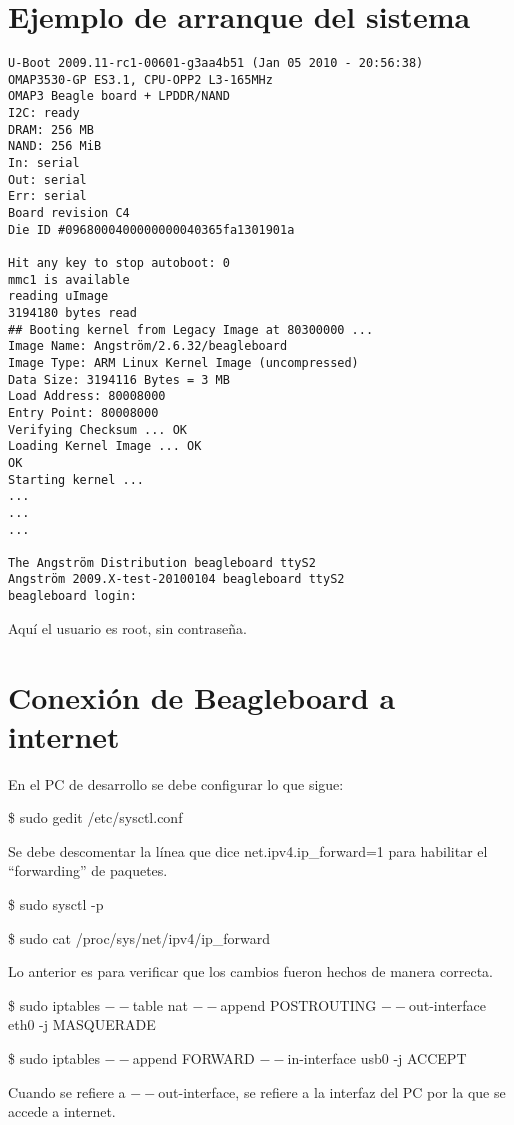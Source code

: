 \newpage
\section{Ejemplo de arranque del sistema}\label{arr}

\begin{verbatim}
U-Boot 2009.11-rc1-00601-g3aa4b51 (Jan 05 2010 - 20:56:38) 
OMAP3530-GP ES3.1, CPU-OPP2 L3-165MHz 
OMAP3 Beagle board + LPDDR/NAND 
I2C: ready 
DRAM: 256 MB 
NAND: 256 MiB 
In: serial 
Out: serial 
Err: serial 
Board revision C4 
Die ID #0968000400000000040365fa1301901a 

Hit any key to stop autoboot: 0 
mmc1 is available 
reading uImage 
3194180 bytes read 
## Booting kernel from Legacy Image at 80300000 ... 
Image Name: Angström/2.6.32/beagleboard 
Image Type: ARM Linux Kernel Image (uncompressed) 
Data Size: 3194116 Bytes = 3 MB 
Load Address: 80008000 
Entry Point: 80008000 
Verifying Checksum ... OK 
Loading Kernel Image ... OK 
OK 
Starting kernel ... 
... 
... 
... 

The Angström Distribution beagleboard ttyS2 
Angström 2009.X-test-20100104 beagleboard ttyS2 
beagleboard login: 
\end{verbatim}

Aquí el usuario es root, sin contraseña.


\newpage
\section{Conexión de Beagleboard a internet}\label{BbInternet}

\bigskip
En el PC de desarrollo se debe configurar lo que sigue:

\bigskip
\centerline{\$ sudo gedit /etc/sysctl.conf}

Se debe descomentar la línea que dice net.ipv4.ip\_forward=1 para habilitar el “forwarding” de paquetes.

\bigskip
\centerline{\$ sudo sysctl -p}

\centerline{\$ sudo cat /proc/sys/net/ipv4/ip\_forward}

Lo anterior es para verificar que los cambios fueron hechos de manera correcta.

\bigskip
\centerline{\$ sudo iptables $--$table nat $--$append POSTROUTING $--$out-interface eth0 -j  MASQUERADE}

\centerline{\$ sudo iptables $--$append FORWARD $--$in-interface usb0 -j ACCEPT}

Cuando se refiere a $--$out-interface, se refiere a la interfaz del PC por la que se accede a internet.



